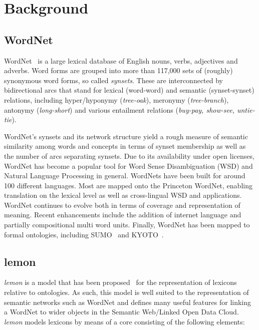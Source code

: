 \documentclass[10pt, a4paper]{article}
\newcommand{\lemon}[0]{\emph{lemon}}
\begin{document}
\section{Background}

\subsection{WordNet}

WordNet~\cite{miller1995wordnet,fellbaum1998wordnet,fellbaum2010wordnet} is a large lexical database of English nouns,
verbs, adjectives and adverbs. Word forms are grouped into more than 117,000 sets of
(roughly) synonymous word forms, so called \emph{synsets}. These are interconnected by bidirectional
arcs that stand for lexical (word-word) and semantic (synset-synset) relations, including
hyper/hyponymy (\emph{tree-oak}), meronymy (\emph{tree-branch}), antonymy
(\emph{long-short}) and various entailment relations (\emph{buy-pay, show-see, untie-
tie}).

WordNet's synsets and its network structure yield a rough measure of semantic similarity
among words and concepts in terms of synset membership as well as the number of arcs
separating synsets. Due to its availability under open licenses, WordNet has become a popular tool for Word Sense
Disambiguation (WSD) and Natural Language Processing in general. WordNets have
been built for around 100 different languages. Most are mapped onto the Princeton
WordNet, enabling translation on the lexical level as well as cross-lingual WSD and
applications. WordNet continues to evolve both in terms of coverage and representation
of meaning. Recent enhancements include the addition of internet language and partially
compositional multi word units. Finally, WordNet has been mapped to formal ontologies, 
including SUMO~\cite{niles2003mapping} and KYOTO~\cite{vossen2014kyoto}.

\subsection{lemon}

\lemon{} is a model that has been proposed~\cite{mccrae2012interchanging} for the representation of
lexicons relative to ontologies. As such, this model is well suited to the
representation of semantic networks such as WordNet and defines many useful
features for linking a WordNet to wider objects in the Semantic Web/Linked Open Data Cloud. \lemon{}
models lexicons by means of a core consisting of the following elements:
\end{document}
